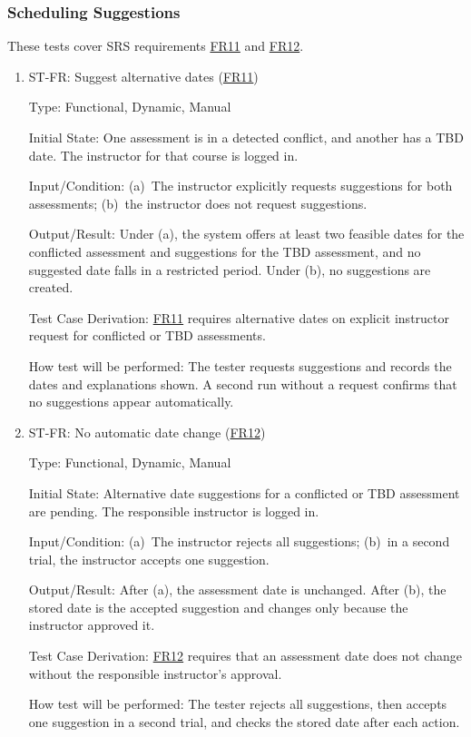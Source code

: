 \documentclass[12pt, titlepage]{article}
\newcounter{stnum}
\newcommand{\frlink}[1]{\href{https://github.com/shivyam/cas-course-optimization/blob/main/pdfs/SRS-IEEE/SRS.pdf}{FR#1}}
\begin{document}
\subsubsection{Scheduling Suggestions}

These tests cover SRS requirements \frlink{11} and \frlink{12}.

\begin{enumerate}

\item{ST-FR\thestnum \label{ST_Suggest_Generation}: Suggest alternative dates (\frlink{11})\\}

Type: Functional, Dynamic, Manual

Initial State: One assessment is in a detected conflict, and another has a TBD date. The instructor for that course is logged in.

Input/Condition: (a)~The instructor explicitly requests suggestions for both assessments; (b)~the instructor does not request suggestions.

Output/Result: Under (a), the system offers at least two feasible dates for the conflicted assessment and suggestions for the TBD assessment, and no suggested date falls in a restricted period. Under (b), no suggestions are created.

Test Case Derivation: \frlink{11} requires alternative dates on explicit instructor request for conflicted or TBD assessments.

How test will be performed: The tester requests suggestions and records the dates and explanations shown. A second run without a request confirms that no suggestions appear automatically.


\item{ST-FR\thestnum \label{ST_Suggest_NoAuto}: No automatic date change (\frlink{12})\\}

Type: Functional, Dynamic, Manual

Initial State: Alternative date suggestions for a conflicted or TBD assessment are pending. The responsible instructor is logged in.

Input/Condition: (a)~The instructor rejects all suggestions; (b)~in a second trial, the instructor accepts one suggestion.

Output/Result: After (a), the assessment date is unchanged. After (b), the stored date is the accepted suggestion and changes only because the instructor approved it.

Test Case Derivation: \frlink{12} requires that an assessment date does not change without the responsible instructor's approval.

How test will be performed: The tester rejects all suggestions, then accepts one suggestion in a second trial, and checks the stored date after each action.

\end{enumerate}
\end{document}
